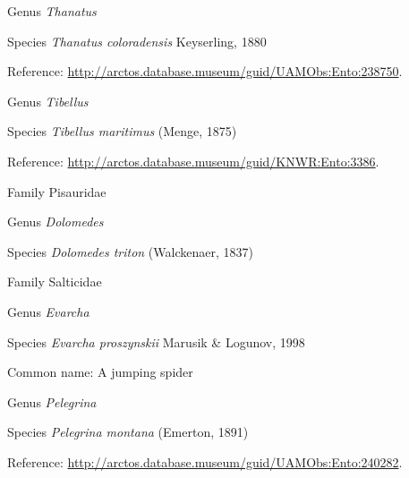 \documentclass[9pt, article]{memoir}
\begin{document}
\begin{multicols}{2}
\vspace{6pt}\noindent\hspace{30pt}Genus \textit{Thanatus}


\vspace{6pt}\noindent\hspace{36pt}Species \textit{Thanatus coloradensis} Keyserling, 1880


Reference: 
\url{http://arctos.database.museum/guid/UAMObs:Ento:238750}.

\vspace{6pt}\noindent\hspace{30pt}Genus \textit{Tibellus}


\vspace{6pt}\noindent\hspace{36pt}Species \textit{Tibellus maritimus} (Menge, 1875)


Reference: 
\url{http://arctos.database.museum/guid/KNWR:Ento:3386}.

\vspace{6pt}\noindent\hspace{24pt}Family Pisauridae


\vspace{6pt}\noindent\hspace{30pt}Genus \textit{Dolomedes}


\vspace{6pt}\noindent\hspace{36pt}Species \textit{Dolomedes triton} (Walckenaer, 1837)


\vspace{6pt}\noindent\hspace{24pt}Family Salticidae


\vspace{6pt}\noindent\hspace{30pt}Genus \textit{Evarcha}


\vspace{6pt}\noindent\hspace{36pt}Species \textit{Evarcha proszynskii} Marusik \& Logunov, 1998


Common name: A jumping spider

\vspace{6pt}\noindent\hspace{30pt}Genus \textit{Pelegrina}


\vspace{6pt}\noindent\hspace{36pt}Species \textit{Pelegrina montana} (Emerton, 1891)


Reference: 
\url{http://arctos.database.museum/guid/UAMObs:Ento:240282}.


\end{multicols}
\end{document}
